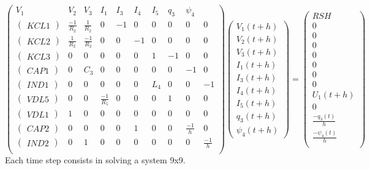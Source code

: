 \[\left(\begin{array}{ccccccccccc}
  V_{1}&V_{2}&V_{3}&I_{1}&I_{3}&I_{4}&I_{5}&q_{3}&\psi _{4}\\
  \hline
  \left(\begin{array}{c} KCL1 \end{array}\right)&\frac{-1}{R_{2}}&\frac{1}{R_{2}}&0&-1&0&0&0&0&0\\
  \left(\begin{array}{c} KCL2 \end{array}\right)&\frac{1}{R_{2}}&\frac{-1}{R_{2}}&0&0&-1&0&0&0&0\\
  \left(\begin{array}{c} KCL3 \end{array}\right)&0&0&0&0&0&1&-1&0&0\\
  \left(\begin{array}{c} CAP1 \end{array}\right)&0&C_{3}&0&0&0&0&0&-1&0\\
  \left(\begin{array}{c} IND1 \end{array}\right)&0&0&0&0&0&L_{4}&0&0&-1\\
  \left(\begin{array}{c} VDL5 \end{array}\right)&0&0&\frac{-1}{R_{5}}&0&0&0&1&0&0\\
  \left(\begin{array}{c} VDL1 \end{array}\right)&1&0&0&0&0&0&0&0&0\\
  \left(\begin{array}{c} CAP2 \end{array}\right)&0&0&0&0&1&0&0&\frac{-1}{h}&0\\
  \left(\begin{array}{c} IND2 \end{array}\right)&0&1&0&0&0&0&0&0&\frac{-1}{h}\\
\end{array}\right) \left(\begin{array}{c}
 V_{1}(t+h)\\
 V_{2}(t+h)\\
 V_{3}(t+h)\\
 I_{1}(t+h)\\
 I_{3}(t+h)\\
 I_{4}(t+h)\\
 I_{5}(t+h)\\
 q_{3}(t+h)\\
 \psi _{4}(t+h)
  \end{array}\right)=
\left(\begin{array}{c}
  RSH\\
  \hline
  0\\
  0\\
  0\\
  0\\
  0\\
  0\\
  0\\
  U_{1}(t+h)\\
  0\\
  \frac{-q_{3}(t)}{h}\\
  \frac{-\psi_{4}(t)}{h}\\
\end{array}\right)\]
Each time step consists in solving a system 9x9.




